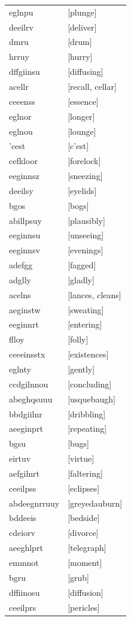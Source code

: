 \documentclass{article}
\begin{document}
\begin{tabular}{ll}
eglnpu & [plunge] \\
deeilrv & [deliver] \\
dmru & [drum] \\
hrruy & [hurry] \\
dffgiinsu & [diffusing] \\
acellr & [recall, cellar] \\
ceeenss & [essence] \\
eglnor & [longer] \\
eglnou & [lounge] \\
'cest & [c'est] \\
cefkloor & [forelock] \\
eeginnsz & [sneezing] \\
deeilsy & [eyelids] \\
bgos & [bogs] \\
abillpsuy & [plausibly] \\
eeginnsu & [unseeing] \\
eeginnsv & [evenings] \\
adefgg & [fagged] \\
adglly & [gladly] \\
acelns & [lances, cleans] \\
aeginstw & [sweating] \\
eeginnrt & [entering] \\
flloy & [folly] \\
ceeeinsstx & [existences] \\
eglnty & [gently] \\
ccdgilnnou & [concluding] \\
abeghqsuuu & [usquebaugh] \\
bbdgiilnr & [dribbling] \\
aeeginprt & [repeating] \\
bgsu & [bugs] \\
eirtuv & [virtue] \\
aefgilnrt & [faltering] \\
ceeilpss & [eclipses] \\
abdeegnrruuy & [greyedauburn] \\
bddeeis & [bedside] \\
cdeiorv & [divorce] \\
aeeghlprt & [telegraph] \\
emmnot & [moment] \\
bgru & [grub] \\
dffiinosu & [diffusion] \\
ceeilprs & [pericles] \\

\end{tabular}
\end{document}
